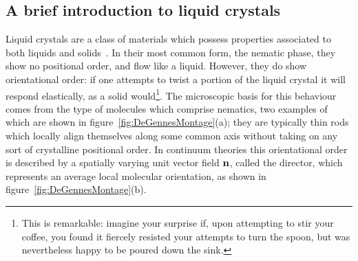 \subsection{A brief introduction to liquid crystals}

Liquid crystals are a class of materials which possess properties associated to both liquids and solids~\citep{deGennes1992}. In their most common form, the nematic phase, they show no positional order, and flow like a liquid. However, they do show orientational order: if one attempts to twist a portion of the liquid crystal it will respond elastically, as a solid would\footnote{This is remarkable: imagine your surprise if, upon attempting to stir your coffee, you found it fiercely resisted your attempts to turn the spoon, but was nevertheless happy to be poured down the sink.}. The microscopic basis for this behaviour comes from the type of molecules which comprise nematics, two examples of which are shown in figure~\ref{fig:DeGennesMontage}(a); they are typically thin rods which locally align themselves along some common axis without taking on any sort of crystalline positional order. In continuum theories this orientational order is described by a spatially varying unit vector field $\bf n$, called the director, which represents an average local molecular orientation, as shown in figure~\ref{fig:DeGennesMontage}(b).

